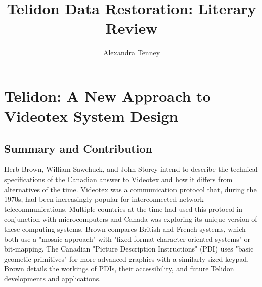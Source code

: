 \documentclass[sigconf]{acmart}
\begin{document}
\title{Telidon Data Restoration: Literary Review}

\author{Alexandra Tenney}

\maketitle

\section{Telidon: A New Approach to Videotex System Design}


\subsection{Summary and Contribution}

Herb Brown,  William Sawchuck, and John Storey intend to describe the technical specifications of the Canadian answer to Videotex and how it differs from alternatives of the time. Videotex was a communication protocol that, during the 1970s, had been increasingly popular for interconnected network telecommunications. Multiple countries at the time had used this protocol in conjunction with microcomputers and Canada was exploring its unique version of these computing systems. Brown compares British and French systems, which both use a "mosaic approach" with "fixed format character-oriented systems" or bit-mapping. The Canadian "Picture Description Instructions" (PDI) uses "basic geometic primitives" for more advanced graphics with a similarly sized keypad. Brown details the workings of PDIs, their accessibility, and future Telidon developments and applications.
\end{document}
